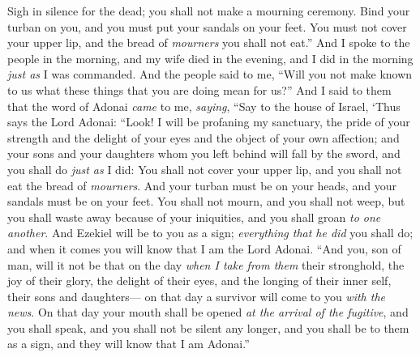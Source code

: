 \begin{biblechapter}
\verse Sigh in silence for the dead; you shall not make a mourning ceremony. Bind your turban on you, and you must put your sandals on your feet. You must not cover your upper lip, and the bread of \textit{mourners} you shall not eat.”
\verse And I spoke to the people in the morning, and my wife died in the evening, and I did in the morning \textit{just as} I was commanded.
\verse And the people said to me, “Will you not make known to us what these things that you are doing mean for us?”
\verse And I said to them that the word of Adonai \textit{came} to me, \textit{saying},
\verse “Say to the house of Israel, ‘Thus says the Lord Adonai: “Look! I will be profaning my sanctuary, the pride of your strength and the delight of your eyes and the object of your own affection; and your sons and your daughters whom you left behind will fall by the sword,
\verse and you shall do \textit{just as} I did: You shall not cover your upper lip, and you shall not eat the bread of \textit{mourners}.
\verse And your turban must be on your heads, and your sandals must be on your feet. You shall not mourn, and you shall not weep, but you shall waste away because of your iniquities, and you shall groan \textit{to one another}.
\verse And Ezekiel will be to you as a sign; \textit{everything that he did} you shall do; and when it comes you will know that I am the Lord Adonai.
\verse “And you, son of man, will it not be that on the day \textit{when I take from them} their stronghold, the joy of their glory, the delight of their eyes, and the longing of their inner self, their sons and daughters—
\verse on that day a survivor will come to you \textit{with the news}.
\verse On that day your mouth shall be opened \textit{at the arrival of the fugitive}, and you shall speak, and you shall not be silent any longer, and you shall be to them as a sign, and they will know that I am Adonai.”
\end{biblechapter}

